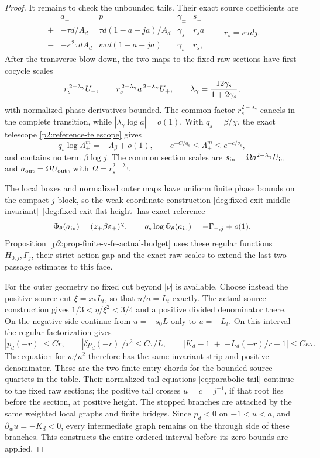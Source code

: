 \begin{proof}
It remains to check the unbounded tails.  Their exact source coefficients
are
\[
\begin{array}{c|cccc}
 &a_\pm&p_\pm&\gamma_\pm&s_\pm\\ \hline
 +&-\tau d/A_d&\tau d(1-a+ja)/A_d&\gamma_s&r_sa\\
 -&-\kappa^2\tau dA_d&\kappa\tau d(1-a+ja)&\gamma_s&r_s,
\end{array}
\qquad r_s=\kappa\tau dj.
\]
After the transverse blow-down, the two maps to the fixed raw sections
have first-cocycle scales
\begin{equation}
 r_s^{\,2-\lambda_\gamma}U_-,\qquad
 r_s^{\,2-\lambda_\gamma}a^{\,2-\lambda_\gamma}U_+,
 \qquad \lambda_\gamma={12\gamma_s\over1+2\gamma_s},
 \label{deg:degree-common-scale}
\end{equation}
with normalized phase derivatives bounded.  The common factor
\(r_s^{2-\lambda_\gamma}\) cancels in the complete transition, while
\(|\lambda_\gamma\log a|=o(1)\). With \(q_s=\beta/\chi\),
the exact telescope \eqref{p2:reference-telescope} gives
\[
 q_s\log\Lambda_+^{m}=-\Lambda_\beta+o(1),\qquad
 e^{-C/q_s}\le\Lambda_+^{m}\le e^{-c/q_s},
\]
and contains no term \(\beta\log j\). The common section scales are
\(s_{\rm in}=\Omega a^{2-\lambda_\gamma}U_{\rm in}\) and
\(a_{\rm out}=\Omega U_{\rm out}\), with
\(\Omega=r_s^{2-\lambda_\gamma}\).

The local boxes and normalized outer maps have uniform finite phase
bounds on the compact $j$-block, so the weak-coordinate construction
\eqref{deg:fixed-exit-middle-invariant}--\eqref{deg:fixed-exit-flat-height}
has exact reference
\[
 \Phi_\theta(a_{\rm in})=(z_+\beta\varepsilon_+)^\chi,
 \qquad q_s\log\Phi_\theta(a_{\rm in})=-\Gamma_{-,j}+o(1).
\]
Proposition~\ref{p2:prop-finite-v-fe-actual-budget} uses these regular
functions \(H_{0,j},\Gamma_j\), their strict action gap and the exact
raw scales to extend the last two passage estimates to this face.

For the outer geometry no fixed cut beyond \(|\nu|\) is available.
Choose instead the positive source cut \(\xi=x_*L_t\), so that
\(u/a=L_t\) exactly.  The actual source construction gives
\(1/3<\eta/\xi^2<3/4\) and a positive divided denominator there.
On the negative side continue from \(u=-s_0L\) only to
\(u=-L_t\).  On this interval the regular factorization gives
\[
 |p_d(-r)|\le Cr,\qquad
 |\delta p_d(-r)|/r^2\le C\tau/L,\qquad
 |K_d-1|+|-L_d(-r)/r-1|\le C\kappa\tau.
\]
The equation for \(w/u^2\) therefore has the same invariant strip
and positive denominator.  These are the two finite entry chords
for the bounded source quartets in the table.  Their normalized
tail equations \eqref{eq:parabolic-tail} continue to the fixed raw
sections; the positive tail crosses \(u=c=j^{-1}\), if that root
lies before the section, at positive height.  The stopped branches
are attached by the same weighted local graphs and finite bridges.
Since \(p_d<0\) on \(-1<u<a\), and \(\partial_w\dot u=-K_d<0\),
every intermediate graph remains on the through side of these
branches.  This constructs the entire ordered interval before its
zero bounds are applied.


\end{proof}
